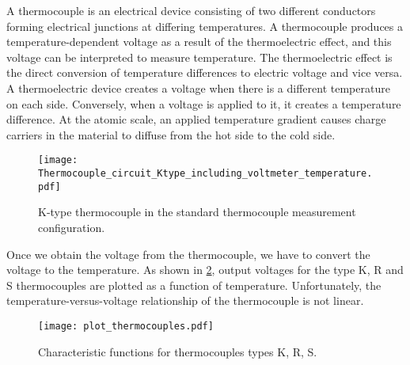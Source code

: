 A thermocouple is an electrical device consisting of two different conductors forming electrical junctions at differing temperatures. A thermocouple produces a temperature-dependent voltage as a result of the thermoelectric effect, and this voltage can be interpreted to measure temperature.
The thermoelectric effect is the direct conversion of temperature differences to electric voltage and vice versa. A thermoelectric device creates a voltage when there is a different temperature on each side. Conversely, when a voltage is applied to it, it creates a temperature difference. At the atomic scale, an applied temperature gradient causes charge carriers in the material to diffuse from the hot side to the cold side.
\begin{figure}[!htp]
	\centering
	\texttt{[image: Thermocouple\_circuit\_Ktype\_including\_voltmeter\_temperature.pdf]}
	\caption{K-type thermocouple in the standard thermocouple measurement configuration.}
	\label{Fig:Thermocouple_circuit_Ktype_including_voltmeter_temperature}
\end{figure}

Once we obtain the voltage from the thermocouple, we have to convert the voltage to the temperature.
As shown in \ref{Fig:plot_thermocouples}, output voltages for the type K, R and S thermocouples are plotted as a function of temperature.
Unfortunately, the temperature-versus-voltage relationship of the thermocouple is not linear.

\begin{figure}[htbp]
	\centering
	\texttt{[image: plot\_thermocouples.pdf]}
	\caption{Characteristic functions for thermocouples types K, R, S.}
	\label{Fig:plot_thermocouples}
\end{figure}

